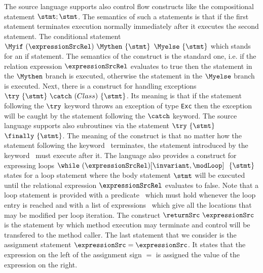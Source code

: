   The source language supports also control flow constructs like  the compositional statement
  $\stmt;\stmt$. The semantics of such a statements is  that if the first statement terminates execution normally
  immediately after it executes the second statement. The conditional statement
  $\Myif \ (\expressionSrcRel) \ \Mythen \ \{ \stmt \} $ $  \Myelse \ \{ \stmt \}  $ which stands for
  an if statement. The semantics of the construct is the standard one, i.e. if the relation expression $\expressionSrcRel$ 
  evaluates to true then the statement in the $ \Mythen$ branch is executed, otherwise the statement in the
  $ \Myelse$ branch is executed. Next, there is a construct for handling exceptions $ \try  \ \{ \stmt \}  \ \catch \ ( Class  )\ \{ \stmt \}  $.
  Its meaning is that if the statement following the $ \try $ keyword throws an exception of type \texttt{Exc} then
  the exception will be caught by the statement following the  $ \catch $ keyword. The source language supports also 
  subroutines via the statement $ \try  \ \{ \stmt \}  $ $ \finally \ \{ \stmt \}$.  The meaning of the construct is that  
  no matter how the statement following the keyword \try \ terminates,
  the statement introduced by the keyword \finally \ must execute after it. The language also provides a construct for expressing loops 
   $ \while \ (\expressionSrcRel) \lbrack \invariant, \modLoop \rbrack \ \do \ \{ \stmt \} $ states for a loop statement where the body 
   statement $ \stmt$ will be executed until the relational expression  $\expressionSrcRel$ evaluates to false.
   Note that a loop statement is provided with a predicate \invariant \ which must hold whenever the loop entry is reached and with a list of expressions
   \modLoop \ which give all the locations that  may be modified per loop iteration. The construct $ \returnSrc \  \expressionSrc $ is
   the statement by which method execution may terminate and control will be transfered to the method caller.
   The last statement that we consider is the assignment statement $ \expressionSrc = \expressionSrc$.
    It states that the expression on the left of the assignment sign $=$ is assigned the value of the expression on the right.

